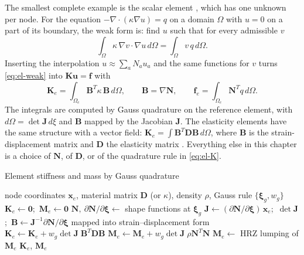 The smallest complete example is the scalar element , which has one unknown per node. For the equation $-\nabla\!\cdot(\kappa\nabla u)=q$ on a domain $\Omega$ with $u=0$ on a part of its boundary, the weak form is: find $u$ such that for every admissible $v$
\begin{equation}\label{eq:el-weak}
\int_\Omega\kappa\,\nabla v\cdot\nabla u\,d\Omega=\int_\Omega v\,q\,d\Omega .
\end{equation}
Inserting the interpolation $u\approx\sum_a N_a u_a$ and the same functions for $v$ turns \eqref{eq:el-weak} into $\bm K\bm u=\bm f$ with
\begin{equation}\label{eq:el-K}
\bm K_e=\int_{\Omega_e}\bm B^{T}\kappa\,\bm B\,d\Omega,\qquad \bm B=\nabla\bm N,\qquad
\bm f_e=\int_{\Omega_e}\bm N^{T}q\,d\Omega .
\end{equation}
The integrals are computed by Gauss quadrature on the reference element, with $d\Omega=\det\bm J\,d\xi$ and $\bm B$ mapped by the Jacobian $\bm J$. The elasticity elements have the same structure with a vector field: $\bm K_e=\int\bm B^{T}\bm D\bm B\,d\Omega$, where $\bm B$ is the strain-displacement matrix and $\bm D$ the elasticity matrix \citep{zienkiewicz2013fem,bathe2014fep}. Everything else in this chapter is a choice of $\bm N$, of $\bm D$, or of the quadrature rule in \eqref{eq:el-K}.


\begin{algbox}{Element stiffness and mass by Gauss quadrature}
\begin{pseudo}
\Require node coordinates $\bm x_e$, material matrix $\bm D$ (or $\kappa$), density $\rho$, Gauss rule $\{\bm\xi_g,w_g\}$
\State $\bm K_e\gets\bm 0$;\ $\bm M_e\gets\bm 0$
  \State $\bm N,\ \partial\bm N/\partial\bm\xi\gets$ shape functions at $\bm\xi_g$
  \State $\bm J\gets(\partial\bm N/\partial\bm\xi)\,\bm x_e$;\ $\det\bm J$;\ $\bm B\gets\bm J^{-1}\partial\bm N/\partial\bm\xi$ mapped into strain--displacement form
  \State $\bm K_e\gets\bm K_e+w_g\det\bm J\;\bm B^T\bm D\bm B$
  \State $\bm M_e\gets\bm M_e+w_g\det\bm J\;\rho\bm N^T\bm N$
\EndFor
{}
  \State $\bm M_e\gets$ HRZ lumping of $\bm M_e$ 
\EndIf
\Ensure $\bm K_e$, $\bm M_e$
\end{pseudo}
\end{algbox}

